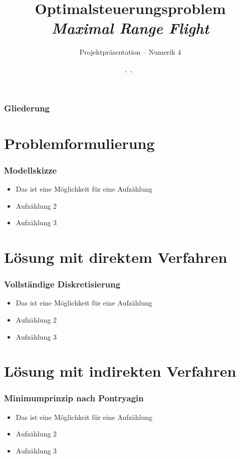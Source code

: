 \documentclass{beamer}
\title{\textbf{Optimalsteuerungsproblem  \\ \textit{Maximal Range Flight}}}
\subtitle{Projektpräsentation -- Numerik 4}
\author{\Heiko,\ \Philipp,\ \Felix}
\institute{\institut, \fakultaet\\}
\begin{document}
\hspace*{-1.49cm}
\frame[plain]{\titlepage}

\hspace*{-0.7cm}
\begin{frame}
  \frametitle{Gliederung}
  \tableofcontents
\end{frame}


\section{Problemformulierung}
\begin{frame}
  \frametitle{Modellskizze}
\vspace{-2.6cm}
  \begin{itemize}
    \item Das ist eine M\"{o}glichkeit f\"{u}r eine Aufz\"{a}hlung
    \item Aufz\"{a}hlung 2
    \item Aufz\"{a}hlung 3
  \end{itemize}
\end{frame}

\section{Lösung mit direktem Verfahren}
\begin{frame}
  \frametitle{Vollständige Diskretisierung}
\vspace{-2.6cm}
  \begin{itemize}
    \item Das ist eine M\"{o}glichkeit f\"{u}r eine Aufz\"{a}hlung
    \item Aufz\"{a}hlung 2
    \item Aufz\"{a}hlung 3
  \end{itemize}
\end{frame}

\section{Lösung mit indirekten Verfahren}
\begin{frame}
  \frametitle{Minimumprinzip nach Pontryagin}
\vspace{-2.6cm}
  \begin{itemize}
    \item Das ist eine M\"{o}glichkeit f\"{u}r eine Aufz\"{a}hlung
    \item Aufz\"{a}hlung 2
    \item Aufz\"{a}hlung 3
  \end{itemize}
\end{frame}
\end{document}
